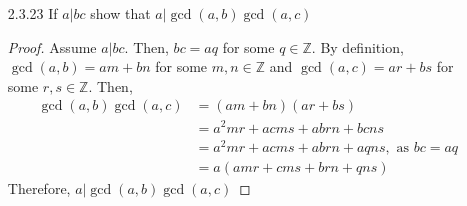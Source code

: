 \documentclass[12pt]{article}
\newcommand{\Z}{\mathds{Z}}
\begin{document}
\begin{enumerate}
\begin{proof}
			As $q$ must be an integer, we need to prove that $\frac{(k+1)(3k+2)(3k+1)}{2}$ is also an integer.
			\begin{enumerate}
				\item[Case 1:] $k$ is even. Then, for some $r\in\Z, k=2r \Rightarrow 3k+2=6r+2=2(3r+1)$. Thus, $ 2 | 3k+2$.
				\item[Case 2:] $k$ is odd. Then, for some $r\in\Z, k=2r+1 \Rightarrow k+1=2r+2=2(r+1)$. Thus, $ 2 | k+1$.
			\end{enumerate}
			Thus, $\frac{(k+1)(3k+2)(3k+1)}{2}$ is an integer. Which means $\frac{[3(k+1)]!}{(3!)^{k+1}}$ must also be an integer.
			Therefore, by mathematical induction, $(3n)!/(3!)^n$ is an integer for all $n\geq 0$.
		\end{proof}
	\item[2.3.23] If $a | bc$ show that $a | \gcd(a,b) \gcd(a,c)$
    	\begin{proof}
    		Assume $a | bc$. Then, $bc = aq$ for some $q\in\Z$. By definition, $\gcd(a,b)=am+bn$ for some $m,n\in\Z$ and $\gcd(a,c)=ar+bs$ for some $r,s\in\Z$. Then,
    			\begin{align*}
    				\gcd(a,b)\gcd(a,c)&=(am+bn)(ar+bs)\\
    								  &=a^2mr+acms+abrn+bcns\\
    								  &=a^2mr+acms+abrn+aqns, \text{ as } bc = aq\\
    								  &= a(amr+cms+brn+qns)
    			\end{align*} 
    			Therefore, $a | \gcd(a,b)\gcd(a,c)$
    	\end{proof}
        
\end{enumerate}
\end{document}
